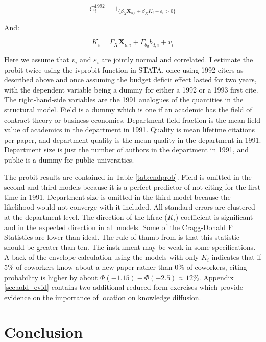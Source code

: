 \begin{equation}
    C^{1992}_i = 1_{\{ \beta_X \mathbf{X}_{o,i} + \beta_K K_i + \varepsilon_i > 0\}}
\end{equation}

And:

\begin{equation}
    K_i = \Gamma_X \mathbf{X}_{o,i} + \Gamma_{b_d} b_{d,i} + v_i
\end{equation}

Here we assume that $v_i$ and $\varepsilon_i$ are jointly normal and
correlated. I estimate the probit twice using the ivprobit function in
STATA, once using 1992 citers as described above and once assuming the
budget deficit effect lasted for two years, with the dependent variable
being a dummy for either a 1992 or a 1993 first cite. The
right-hand-side variables are the 1991 analogues of the quantities in
the structural model. Field is a dummy which is one if an academic has the
field of contract theory or business economics. Department field
fraction is the mean field value of academics in the department in 1991.
Quality is mean lifetime citations per paper, and department quality is
the mean quality in the department in 1991. Department size is just the
number of authors in the department in 1991, and public is a dummy for
public universities. 


The probit results are contained in Table \ref{tab:endprob}.  Field is
omitted in the second and third models
because it is a perfect predictor of not citing for the first time in
1991. Department size is omitted in the third model because the
likelihood would not converge with it included. All standard errors are 
clustered at the department level.  The direction of the
kfrac ($K_i$) coefficient is significant and in the expected direction
in all models. Some of the Cragg-Donald F Statistics are lower than ideal.
The rule of thumb from \citet{staiger1997instrumental} is that this statistic
should be greater than ten.  The instrument may be weak in some specifications.
A back of the envelope calculation using the models with
only $K_i$ indicates that if 5\% of coworkers know
about a new paper rather than 0\% of coworkers, citing probability is higher 
by about $\Phi(-1.15) - \Phi(-2.5) \approx 12\%$.  Appendix \ref{sec:add_evid}
 contains two additional reduced-form exercises which provide
 evidence on the importance of location on knowledge diffusion.

\section{Conclusion}

